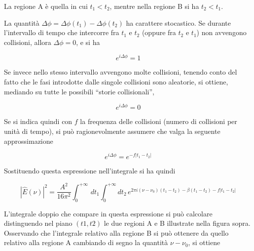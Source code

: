 \begin{figure}[H]
  \centering
\end{figure}

La regione A è quella in cui $t_1 < t_2$, mentre nella regione B si ha $t_2 < t_1$.

\vspace{0.2cm}La quantità $\Delta \phi=\Delta \phi(t_1) - \Delta \phi(t_2)$ ha carattere stocastico. Se durante l'intervallo di tempo che intercorre fra $t_1$ e $t_2$ (oppure fra $t_2$ e $t_1$) non avvengono collisioni, allora $\Delta \phi=0$, e si ha

\begin{equation*}
  e^{i\Delta \phi}=1
\end{equation*}

Se invece nello stesso intervallo avvengono molte collisioni, tenendo conto del fatto che le fasi introdotte dalle singole collisioni sono aleatorie, si ottiene, mediando su tutte le possibili “storie collisionali”,

\begin{equation*}
  e^{i\Delta \phi}=0
\end{equation*}

Se si indica quindi con $f$ la frequenza delle collisioni (numero di collisioni per unità di tempo), si può ragionevolmente assumere che valga la seguente approssimazione

\begin{equation*}
  e^{i\Delta \phi}=e^{-f|t_1 - t_2|}
\end{equation*}

Sostituendo questa espressione nell'integrale si ha quindi

\begin{equation*}
  |\hat{E}(\nu)|^2=\frac{A^2}{16 \pi^2}\int_{0}^{+\infty}\, dt_1 \int_{0}^{+\infty} dt_2\, e^{2\pi i(\nu-\nu_0)(t_1-t_2)-\beta (t_1-t_2)-f|t_1 - t_2|}
\end{equation*}

L'integrale doppio che compare in questa espressione si può calcolare distinguendo nel piano $(t1, t2)$ le due regioni A e B illustrate nella figura sopra. Osservando che l'integrale relativo alla regione B si può ottenere da quello relativo alla regione A cambiando di segno la quantità $\nu - \nu_0$, si ottiene

